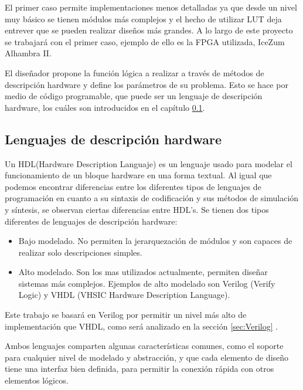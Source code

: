 El primer caso permite implementaciones menos detalladas ya que desde un nivel muy básico se tienen módulos más complejos y el hecho de utilizar LUT deja entrever que se pueden realizar diseños más grandes. A lo largo de este proyecto se trabajará con el primer caso, ejemplo de ello es la FPGA utilizada, IceZum Alhambra II. \newline

El diseñador propone la función lógica a realizar a través de métodos de descripción hardware y define los parámetros de su problema. Esto se hace por medio de código programable, que puede ser un lenguaje de descripción hardware, los cuáles son introducidos en el capítulo \ref{sec:DescripcionHardware}. 

\subsection{Lenguajes de descripción hardware}\label{sec:DescripcionHardware}

Un HDL(Hardware Description Languaje) es un lenguaje usado para modelar el funcionamiento de un bloque hardware en una forma textual. \newline 
Al igual que podemos encontrar diferencias entre los diferentes tipos de lenguajes de programación en cuanto a su sintaxis de codificación y sus métodos de simulación y síntesis, se observan ciertas diferencias entre HDL's. \newline
Se tienen dos tipos diferentes de lenguajes de descripción hardware:
\begin{itemize}
	\item Bajo modelado. No permiten la jerarquezación de módulos y son capaces de realizar solo descripciones simples.
	\item Alto modelado. Son los mas utilizados actualmente, permiten diseñar sistemas más complejos. Ejemplos de alto modelado son Verilog (Verify Logic) y VHDL (VHSIC Hardware Description Language).
\end{itemize}	
Este trabajo se basará en Verilog por permitir un nivel más alto de implementación que VHDL, como será analizado en la sección \ref{sec:Verilog} . \newline

Ambos lenguajes comparten algunas características comunes, como el soporte para cualquier nivel de modelado y abstracción, y que cada elemento de diseño tiene una interfaz bien definida, para permitir la conexión rápida con otros elementos lógicos.

